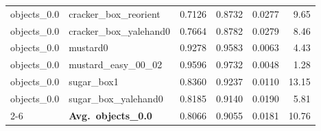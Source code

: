 \begin{longtable}{llrrrr}
  objects_0.0 & cracker\_box\_reorient & 0.7126 & 0.8732 & 0.0277 & 9.65 \\
  objects_0.0 & cracker\_box\_yalehand0 & 0.7664 & 0.8782 & 0.0279 & 8.46 \\
  objects_0.0 & mustard0 & 0.9278 & 0.9583 & 0.0063 & 4.43 \\
  objects_0.0 & mustard\_easy\_00\_02 & 0.9596 & 0.9732 & 0.0048 & 1.28 \\
  objects_0.0 & sugar\_box1 & 0.8360 & 0.9237 & 0.0110 & 13.15 \\
  objects_0.0 & sugar\_box\_yalehand0 & 0.8185 & 0.9140 & 0.0190 & 5.81 \\
  \cmidrule{2-6}
  & \textbf{Avg.~objects_0.0} & 0.8066 & 0.9055 & 0.0181 & 10.76 \\
  \midrule
\bottomrule
\end{longtable}